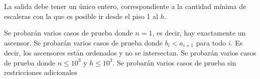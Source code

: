 \documentclass{oci}
\begin{document}
\begin{outputDescription}
  La salida debe tener un único entero, correspondiente a la
  cantidad mínima de escaleras con la que es posible ir desde
  el piso 1 al $h$.
\end{outputDescription}

\newpage
\begin{scoreDescription}
   Se probarán varios casos de prueba donde $n = 1$, es decir, hay exactamente un
  ascensor.
   Se probarán varios casos de prueba donde $b_i < a_{i+1}$ para todo $i$.
  Es decir, los ascensores están ordenados y no se intersectan.
   Se probarán varios casos de prueba donde $n \leq 10^3$ y $h \leq 10^3$.
   Se probarán varios casos de prueba sin restricciones adicionales
\end{scoreDescription}

\begin{sampleDescription}
\end{sampleDescription}
\end{document}
